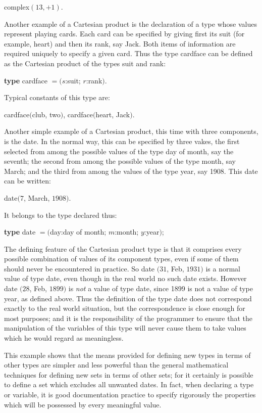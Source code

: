 \documentclass[twoside,11pt]{book}
\begin{document}
\quad complex$(13, + 1)$.

\noindent
Another example of a Cartesian product is the declaration of a type whose values represent playing cards. Each card can be specified by giving first its suit (for example, heart) and then its rank, say Jack. Both items of information are required uniquely to specify a given card. Thus the type cardface can be defined as the Cartesian product of the types suit and rank:

\quad \textbf{type} cardface $= (s$:suit; $r$:rank$)$.

Typical constants of this type are:

\quad cardface$($club, two$)$, cardface$($heart, Jack$)$.

Another simple example of a Cartesian product, this time with three
components, is the date. In the normal way, this can be specified by three
vakes, the first selected from among the possible values of the type day of
month, say the seventh; the second from among the possible values of the
type month, say March; and the third from among the values of the type
year, say 1908. This date can be written:

\quad date$(7$, March, $1908)$.

\noindent
It belongs to the type declared thus:

\quad \textbf{type} date $= ($day:day of month; $m$:month; $y$:year$)$;

The defining feature of the Cartesian product type is that it comprises every possible combination of values of its component types, even if some of them should never be encountered in practice. So date $(31$, Feb, $1931)$ is a normal value of type date, even though in the real world no such date exists. However date $(28$, Feb, $1899)$ is \textit{not} a value of type date, since 1899 is not a value of type year, as defined above. Thus the definition of the type date does not correspond exactly to the real world situation, but the correspondence is close enough for most purposes; and it is the responsibility of the programmer to ensure that the manipulation of the variables of this type will never cause them to take values which he would regard as meaningless.

This example shows that the means provided for defining new types in terms of other types are simpler and less powerful than the general mathematical techniques for defining new sets in terms of other sets; for it certainly is possible to define a set which excludes all unwanted dates. In fact, when declaring a type or variable, it is good documentation practice to specify rigorously the properties which will be possessed by every meaningful value.
 
\end{document}

